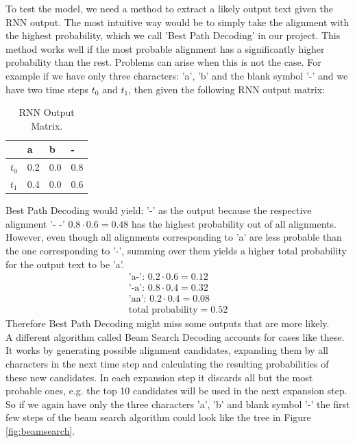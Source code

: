\documentclass{article}
\begin{document}
To test the model, we need a method to extract a likely output text given the RNN output. The most intuitive way would be to simply take the alignment with the highest probability, which we call 'Best Path Decoding' in our project. This method works well if the most probable alignment has a significantly higher probability than the rest. Problems can arise when this is not the case. For example if we have only three characters: 'a', 'b' and the blank symbol '-' and we have two time steps \(t_0\) and \(t_1\), then given the following RNN output matrix:
\begin{table}[H]
\centering
\begin{tabular}{l|l|l|l}
\label{tab:RNNOutputProblem}
       & a & b & - \\ \hline
\(t_0\) & 0.2 & 0.0 & 0.8 \\ \hline
\(t_1\) & 0.4 & 0.0 & 0.6 \\ \hline
\end{tabular}
\caption{RNN Output Matrix.}
\end{table}
Best Path Decoding would yield: '-' as the output because the respective alignment '- -' \(0.8\cdot 0.6 = 0.48\) has the highest probability out of all alignments. However, even though all alignments corresponding to 'a' are less probable than the one corresponding to '-', summing over them yields a higher total probability for the output text to be 'a'. 
\[
\begin{split}
\text{'a-': } 0.2\cdot 0.6 = 0.12\\
\text{'-a': } 0.8\cdot 0.4 = 0.32\\
\text{'aa': } 0.2\cdot 0.4 = 0.08\\
\text{total probability} = 0.52
\end{split}
\]
Therefore Best Path Decoding might miss some outputs that are more likely.\\
A different algorithm called Beam Search Decoding accounts for cases like these. It works by generating possible alignment candidates, expanding them by all characters in the next time step and calculating the resulting probabilities of these new candidates. In each expansion step it discards all but the most probable ones, e.g. the top 10 candidates will be used in the next expansion step. So if we again have only the three characters 'a', 'b' and blank symbol '-' the first few steps of the beam search algorithm could look like the tree in Figure \ref{fig:beamsearch}.
\end{document}
